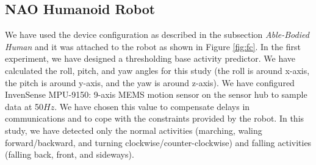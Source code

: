\documentclass[letterpaper]{article}
\begin{document}
\subsection{NAO Humanoid Robot}


We have used the device configuration as described  in the subsection {\em Able-Bodied Human} 
and it was attached to the robot as shown in Figure \ref{fig:fc}. In the first experiment, we have 
designed a thresholding base activity  predictor. We have calculated the roll, pitch, and yaw angles 
for this study (the roll is around x-axis, the pitch is around y-axis, and the yaw is around 
z-axis). We have configured InvenSense MPU-9150: 9-axis MEMS motion sensor on the sensor hub to 
sample data at 50$Hz$. We have chosen this value to compensate delays in communications and to cope 
with the constraints provided by the robot. In this study, we have detected only the normal 
activities (marching, waling forward/backward, and turning clockwise/counter-clockwise)
and falling activities (falling back, front, and sideways).
\end{document}
